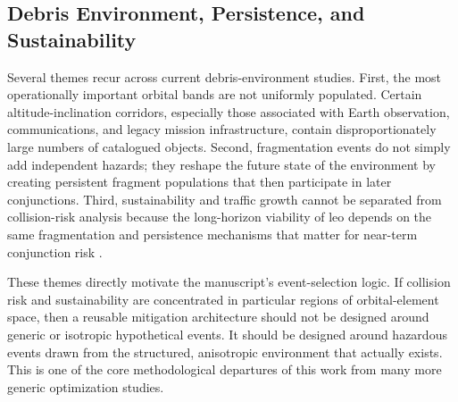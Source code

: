 \subsection{Debris Environment, Persistence, and Sustainability}
Several themes recur across current debris-environment studies. First, the most operationally important orbital bands are not uniformly populated. Certain altitude-inclination corridors, especially those associated with Earth observation, communications, and legacy mission infrastructure, contain disproportionately large numbers of catalogued objects. Second, fragmentation events do not simply add independent hazards; they reshape the future state of the environment by creating persistent fragment populations that then participate in later conjunctions. Third, sustainability and traffic growth cannot be separated from collision-risk analysis because the long-horizon viability of \gls{leo} depends on the same fragmentation and persistence mechanisms that matter for near-term conjunction risk \cite{Muciaccia2024LEOCapacity,Wagner2024ADR,Harada2024NEODEEM}.

These themes directly motivate the manuscript's event-selection logic. If collision risk and sustainability are concentrated in particular regions of orbital-element space, then a reusable mitigation architecture should not be designed around generic or isotropic hypothetical events. It should be designed around hazardous events drawn from the structured, anisotropic environment that actually exists. This is one of the core methodological departures of this work from many more generic optimization studies.

